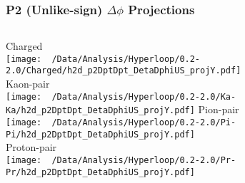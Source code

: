 \documentclass{beamer}
\begin{document}
\begin{frame}
	\frametitle{P2 (Unlike-sign) $\Delta\phi$ Projections}
	\begin{columns}
		\centering
		Charged\\
		\texttt{[image: ~/Data/Analysis/Hyperloop/0.2-2.0/Charged/h2d\_p2DptDpt\_DetaDphiUS\_projY.pdf]}\\Kaon-pair\\
		\texttt{[image: ~/Data/Analysis/Hyperloop/0.2-2.0/Ka-Ka/h2d\_p2DptDpt\_DetaDphiUS\_projY.pdf]}
		\centering
		Pion-pair\\
		\texttt{[image: ~/Data/Analysis/Hyperloop/0.2-2.0/Pi-Pi/h2d\_p2DptDpt\_DetaDphiUS\_projY.pdf]}\\Proton-pair\\
		\texttt{[image: ~/Data/Analysis/Hyperloop/0.2-2.0/Pr-Pr/h2d\_p2DptDpt\_DetaDphiUS\_projY.pdf]}
	\end{columns}
\end{frame}
\end{document}
